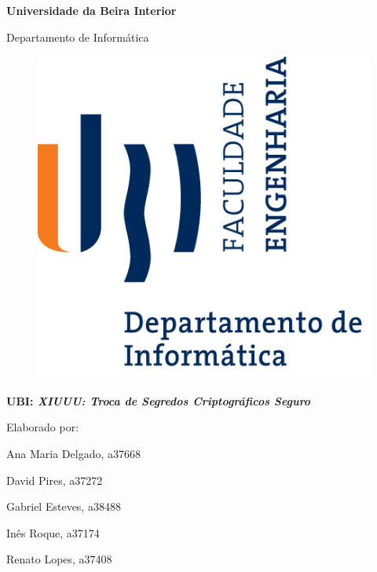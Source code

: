 
\thispagestyle{empty}
\setcounter{page}{-1}

\begin{center}
\begin{Huge}
\textbf{Universidade da Beira Interior}
\end{Huge}
\end{center}

\begin{center}
\begin{Huge}
Departamento de Informática
\end{Huge}
\end{center}

\vspace{0,07cm}
\begin{figure}[!htb]
\centering
\includegraphics[scale=2.00]{ubi-fe-di.png}
\end{figure}

\vspace{0.5cm}
\begin{center}
\begin{Large}
\textbf{UBI: \emph{XIUUU: Troca de Segredos Criptográficos Seguro
}}
\end{Large}
\end{center}

\vspace{0.5cm}

\begin{center}
\begin{normalsize}

Elaborado por: \par
Ana Maria Delgado, a37668 \par
David Pires, a37272 \par
Gabriel Esteves, a38488 \par
Inês Roque, a37174 \par
Renato Lopes, a37408 \par

\end{normalsize}
\end{center}

